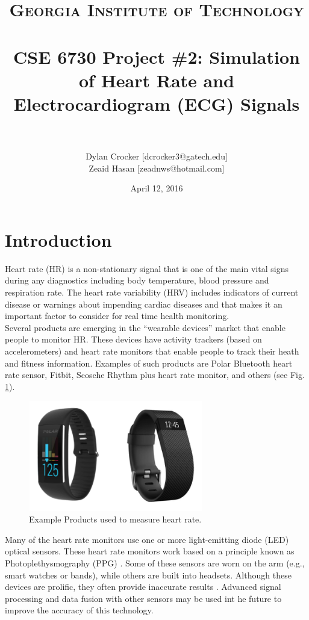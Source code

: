 \documentclass[paper=a4, fontsize=11pt]{scrartcl}
\title{ 	
	\usefont{OT1}{bch}{b}{n}
	\normalfont \normalsize \textsc{Georgia Institute of Technology} \\ [25pt]
	\horrule{0.5pt} \\[0.4cm]
	\huge CSE 6730 Project \#2: Simulation of Heart Rate and Electrocardiogram (ECG) Signals\\
	\horrule{2pt} \\[0.5cm]
}
\author{
	Dylan Crocker [dcrocker3@gatech.edu]\\
    Zeaid Hasan [zeadnws@hotmail.com]
}
\date{April 12, 2016}
\numberwithin{equation}{section}		%
\numberwithin{figure}{section}			%
\numberwithin{table}{section}		    %
\begin{document}
\maketitle

\section{Introduction}
Heart rate (HR) is a non-stationary signal that is one of the main vital signs during any 
diagnostics including body temperature, blood pressure and respiration rate. The heart rate 
variability (HRV) includes indicators of current disease or warnings about impending cardiac 
diseases \cite{smith2002heart} and that makes it an important factor to consider for real time 
health monitoring.\\

Several products are emerging in the ``wearable devices'' market that enable people to monitor HR.
These devices have activity trackers (based on accelerometers) and heart rate monitors 
\cite{lee2014track} that enable people to track their heath and fitness information. Examples of 
such products are Polar Bluetooth heart rate sensor, Fitbit, Scosche Rhythm plus heart rate 
monitor, and others (see Fig. \ref{fig:wearables}).

\begin{figure}[H]
	\begin{center} 
		\includegraphics[height=1.9in,width=3in]{wearables} 
		\caption{Example Products used to measure heart rate.\label{fig:wearables}} 
	\end{center} 
\end{figure}

Many of the heart rate monitors use one or more light-emitting diode (LED) optical sensors. 
These heart rate monitors work based on a principle known as Photoplethysmography (PPG) \cite{alian2014photoplethysmography}. Some of these sensors are worn on the arm (e.g., smart 
watches or bands), while others are built into headsets. Although these devices are prolific, 
they often provide inaccurate results \cite{parak2014evaluation}. Advanced signal processing 
and data fusion with other sensors may be used int he future to improve the 
accuracy of this technology.\\
\end{document}
